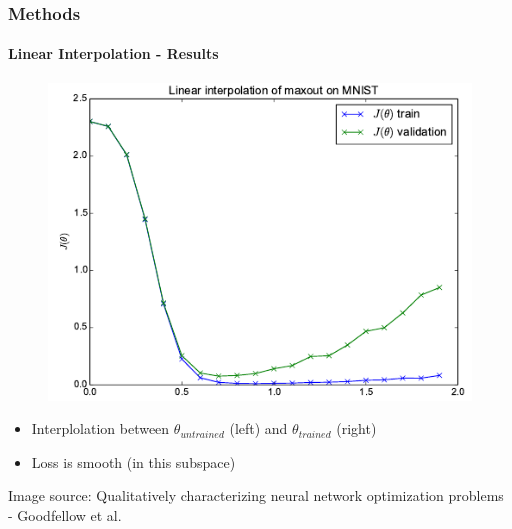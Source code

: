 \documentclass[9pt]{beamer}
\begin{document}
\begin{frame}
\frametitle{Methods}
\framesubtitle{Linear Interpolation - Results}
\begin{figure}
	\includegraphics[width=.7\linewidth]{figures/linear_interpol_1.png}
\end{figure}
\begin{itemize}
	\item Interplolation between $\theta_{untrained}$ (left) and $\theta_{trained}$ (right)
	\item Loss is smooth (in this subspace)
\end{itemize}
\tiny\color{lightgray}Image source: Qualitatively characterizing neural network optimization problems - Goodfellow et al.
\end{frame} 
\end{document}
